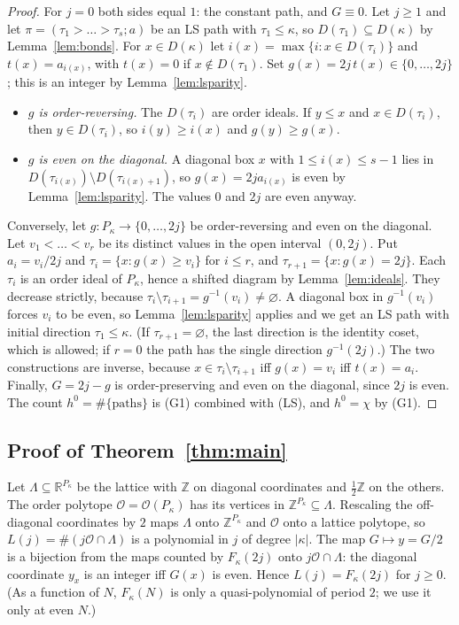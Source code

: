 \documentclass[11pt]{amsart}
\theoremstyle{definition}
\theoremstyle{remark}
\newcommand{\Z}{\mathbb{Z}}
\newcommand{\R}{\mathbb{R}}
\newcommand{\ord}{\mathcal{O}}
\begin{document}
\begin{proof}
For $j=0$ both sides equal $1$: the constant path, and $G\equiv0$. Let $j\ge1$ and let
$\pi=(\tau_1>\dots>\tau_s;a)$ be an LS path with $\tau_1\le\kappa$, so
$D(\tau_1)\subseteq D(\kappa)$ by Lemma~\ref{lem:bonds}. For $x\in D(\kappa)$ let
$i(x)=\max\{i:x\in D(\tau_i)\}$ and $t(x)=a_{i(x)}$, with $t(x)=0$ if $x\notin D(\tau_1)$.
Set $g(x)=2j\,t(x)\in\{0,\dots,2j\}$; this is an integer by Lemma~\ref{lem:lsparity}.
\begin{itemize}
\item \emph{$g$ is order-reversing.} The $D(\tau_i)$ are order ideals. If $y\le x$ and
$x\in D(\tau_i)$, then $y\in D(\tau_i)$, so $i(y)\ge i(x)$ and $g(y)\ge g(x)$.
\item \emph{$g$ is even on the diagonal.} A diagonal box $x$ with $1\le i(x)\le s-1$ lies in
$D(\tau_{i(x)})\setminus D(\tau_{i(x)+1})$, so $g(x)=2ja_{i(x)}$ is even by
Lemma~\ref{lem:lsparity}. The values $0$ and $2j$ are even anyway.
\end{itemize}
Conversely, let $g\colon P_\kappa\to\{0,\dots,2j\}$ be order-reversing and even on the
diagonal. Let $v_1<\dots<v_r$ be its distinct values in the open interval $(0,2j)$. Put
$a_i=v_i/2j$ and $\tau_i=\{x:g(x)\ge v_i\}$ for $i\le r$, and $\tau_{r+1}=\{x:g(x)=2j\}$.
Each $\tau_i$ is an order ideal of $P_\kappa$, hence a shifted diagram by
Lemma~\ref{lem:ideals}. They decrease strictly, because
$\tau_i\setminus\tau_{i+1}=g^{-1}(v_i)\ne\varnothing$. A diagonal box in $g^{-1}(v_i)$ forces
$v_i$ to be even, so Lemma~\ref{lem:lsparity} applies and we get an LS path with initial
direction $\tau_1\le\kappa$. (If $\tau_{r+1}=\varnothing$, the last direction is the identity
coset, which is allowed; if $r=0$ the path has the single direction $g^{-1}(2j)$.) The two
constructions are inverse, because $x\in\tau_i\setminus\tau_{i+1}$ iff $g(x)=v_i$ iff
$t(x)=a_i$. Finally, $G=2j-g$ is order-preserving and even on the diagonal, since $2j$ is
even. The count $h^0=\#\{\text{paths}\}$ is (G1) combined with (LS), and $h^0=\chi$ by (G1).
\end{proof}

\subsection{Proof of Theorem~\ref{thm:main}}\label{ssec:proof-main}
Let $\Lambda\subseteq\R^{P_\kappa}$ be the lattice with $\Z$ on diagonal coordinates and
$\tfrac12\Z$ on the others. The order polytope $\ord=\ord(P_\kappa)$ has its vertices in
$\Z^{P_\kappa}\subseteq\Lambda$. Rescaling the off-diagonal coordinates by $2$ maps $\Lambda$
onto $\Z^{P_\kappa}$ and $\ord$ onto a lattice polytope, so $L(j)=\#(j\ord\cap\Lambda)$ is a
polynomial in $j$ of degree $|\kappa|$. The map $G\mapsto y=G/2$ is a bijection from the maps
counted by $F_\kappa(2j)$ onto $j\ord\cap\Lambda$: the diagonal coordinate $y_x$ is an integer
iff $G(x)$ is even. Hence $L(j)=F_\kappa(2j)$ for $j\ge0$. (As a function of $N$, $F_\kappa(N)$
is only a quasi-polynomial of period $2$; we use it only at even $N$.)
\end{document}
